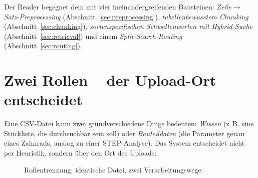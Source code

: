\documentclass[12pt, a4paper]{article}
\begin{document}
Der Reader begegnet dem mit vier ineinandergreifenden Bausteinen:
\emph{Zeile$\rightarrow$Satz-Preprocessing} (Abschnitt~\ref{sec:preprocessing}),
\emph{tabellenbewusstem Chunking} (Abschnitt~\ref{sec:chunking}),
\emph{sortenspezifischen Schwellenwerten mit Hybrid-Suche}
(Abschnitt~\ref{sec:retrieval}) und einem \emph{Split-Search-Routing}
(Abschnitt~\ref{sec:routing}).

\section{Zwei Rollen -- der Upload-Ort entscheidet}

Eine CSV-Datei kann zwei grundverschiedene Dinge bedeuten: \emph{Wissen}
(z.\,B. eine Stückliste, die durchsuchbar sein soll) oder \emph{Bauteildaten}
(die Parameter genau eines Zahnrads, analog zu einer STEP-Analyse). Das System
entscheidet nicht per Heuristik, sondern über den Ort des Uploads:

\begin{figure}[H]
\centering
{}
\caption{Rollentrennung: identische Datei, zwei Verarbeitungswege.}
\end{figure}
\end{document}
